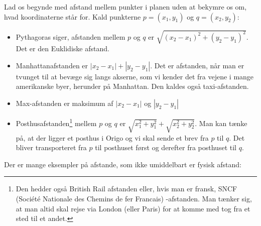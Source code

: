 \documentclass[a4paper, 12pt]{article}
\theoremstyle{remark}
\begin{document}
Lad os begynde med afstand mellem punkter i planen uden at bekymre os om, hvad koordinaterne står for. Kald punkterne $p=(x_1,y_1)$ og $q=(x_2,y_2)$: 
\begin{itemize}
\item Pythagoras siger, afstanden mellem $p$ og $q$ er $\sqrt{(x_2-x_1)^2+(y_2-y_1)^2}$. Det er den Euklidiske afstand.
\item Manhattanafstanden er $|x_2-x_1|+|y_2-y_1|$. Det er afstanden, når man er tvunget til at bevæge sig langs akserne, som vi kender det fra vejene i mange amerikanske byer, herunder på Manhattan. Den kaldes også taxi-afstanden. 
\item Max-afstanden er maksimum af   $|x_2-x_1|$ og $|y_2-y_1|$
\item Posthusafstanden\footnote{Den hedder også British Rail afstanden eller, hvis man er fransk, SNCF (Société Nationale des Chemins de fer Francais) -afstanden. Man tænker sig, at man altid skal rejse via London (eller Paris) for at komme med tog fra et sted til et andet.} mellem $p$ og $q$ er $\sqrt{x_1^2+y_1^2}+\sqrt{x_2^2+y_2^2}$. Man kan tænke på, at der ligger et posthus i Origo og vi skal sende et brev fra $p$ til $q$. Det bliver transporteret fra $p$  til posthuset først og derefter fra posthuset til $q$.
\end{itemize}
Der er mange eksempler på afstande, som ikke umiddelbart er fysisk afstand:
\end{document}
